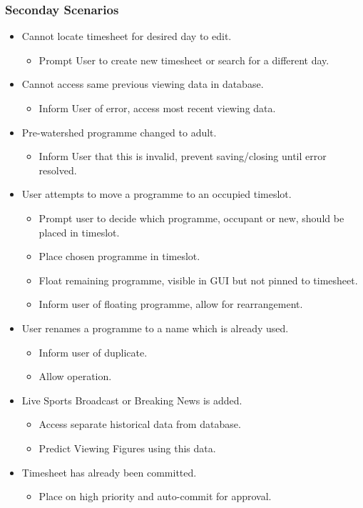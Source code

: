 \documentclass[11pt, oneside]{article}
\begin{document}
\subsubsection*{Seconday Scenarios}
\begin{itemize}
\renewcommand\labelitemi{--}
\renewcommand\labelitemii{$\circ$}
 \renewcommand{\labelenumi}{(\alph{enumi})}
 \item Cannot locate timesheet for desired day to edit.
 	\begin{itemize}
 	\item Prompt User to create new timesheet or search for a different day.
	\end{itemize}
\item Cannot access same previous viewing data in database.
	\begin{itemize}
 	\item Inform User of error, access most recent viewing data.
	\end{itemize}
\item Pre-watershed programme changed to adult.
	\begin{itemize}
 	\item Inform User that this is invalid, prevent saving/closing until error resolved.
	\end{itemize}
\item User attempts to move a programme to an occupied timeslot.
	\begin{itemize}
 	\item Prompt user to decide which programme, occupant or new, should be placed in timeslot.
	\item Place chosen programme in timeslot.
	\item Float remaining programme, visible in GUI but not pinned to timesheet.
	\item Inform user of floating programme, allow for rearrangement.
	\end{itemize}
\item User renames a programme to a name which is already used.
	\begin{itemize}
	\item Inform user of duplicate.
	\item Allow operation.
	\end{itemize}
\item Live Sports Broadcast or Breaking News is added.
	\begin{itemize}
	\item Access separate historical data from database.
	\item Predict Viewing Figures using this data.
	\end{itemize}
\item Timesheet has already been committed.
	\begin{itemize}
 	\item Place on high priority and auto-commit for approval.
	\end{itemize}
 \end{itemize}
\end{document}
